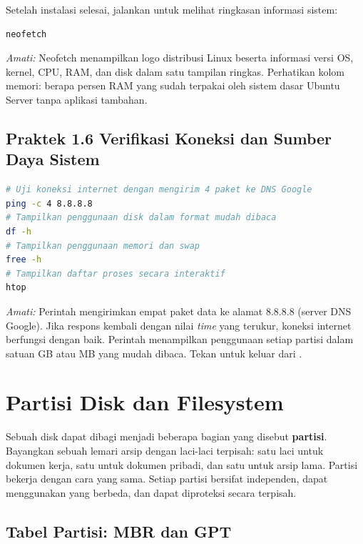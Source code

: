 Setelah instalasi selesai, jalankan  untuk melihat ringkasan informasi
sistem:

\begin{lstlisting}[language=bash, caption={Menampilkan informasi sistem}]
neofetch
\end{lstlisting}

\textit{Amati:} Neofetch menampilkan logo distribusi Linux beserta informasi versi OS,
kernel, CPU, RAM, dan disk dalam satu tampilan ringkas. Perhatikan kolom memori: berapa
persen RAM yang sudah terpakai oleh sistem dasar Ubuntu Server tanpa aplikasi tambahan.

\subsection*{Praktek 1.6 Verifikasi Koneksi dan Sumber Daya Sistem}

\begin{lstlisting}[language=bash, caption={Pemeriksaan jaringan dan sumber daya}]
# Uji koneksi internet dengan mengirim 4 paket ke DNS Google
ping -c 4 8.8.8.8
# Tampilkan penggunaan disk dalam format mudah dibaca
df -h
# Tampilkan penggunaan memori dan swap
free -h
# Tampilkan daftar proses secara interaktif
htop
\end{lstlisting}

\textit{Amati:} Perintah  mengirimkan empat paket data ke alamat 8.8.8.8
(server DNS Google). Jika respons kembali dengan nilai \textit{time} yang terukur,
koneksi internet berfungsi dengan baik. Perintah  menampilkan penggunaan
setiap partisi dalam satuan GB atau MB yang mudah dibaca. Tekan  untuk
keluar dari .

\section{Partisi Disk dan Filesystem}
\label{sec:disk-partitioning}

Sebuah disk dapat dibagi menjadi beberapa bagian yang disebut \textbf{partisi}. Bayangkan
sebuah lemari arsip dengan laci-laci terpisah: satu laci untuk dokumen kerja, satu untuk
dokumen pribadi, dan satu untuk arsip lama. Partisi bekerja dengan cara yang sama. Setiap
partisi bersifat independen, dapat menggunakan  yang berbeda, dan dapat
diproteksi secara terpisah.

\subsection{Tabel Partisi: MBR dan GPT}

